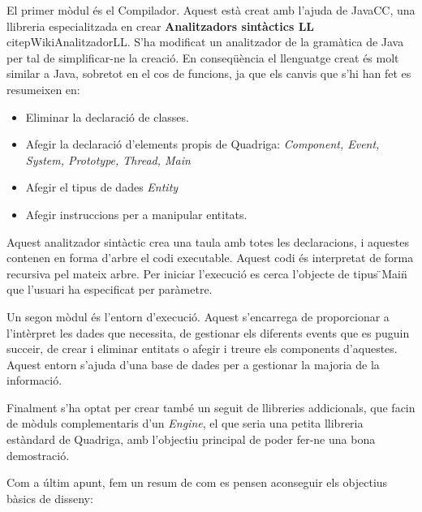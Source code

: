   El primer mòdul és el Compilador. Aquest està creat amb l'ajuda de JavaCC, una llibreria especialitzada en crear {\bf Analitzadors sintàctics LL} citep{WikiAnalitzadorLL}. S'ha modificat un analitzador de la gramàtica de Java per tal de simplificar-ne la creació. En conseqüència el llenguatge creat és molt similar a Java, sobretot en el cos de funcions, ja que els canvis que s'hi han fet es resumeixen en:
  
  \begin{itemize}
    \item Eliminar la declaració de classes.
    \item Afegir la declaració d'elements propis de Quadriga: {\em Component, Event, System, Prototype, Thread, Main}
    \item Afegir el tipus de dades {\em Entity}
    \item Afegir instruccions per a manipular entitats.
  \end{itemize}
  
  Aquest analitzador sintàctic crea una taula amb totes les declaracions, i aquestes contenen en forma d'arbre el codi executable. Aquest codi és interpretat de forma recursiva pel mateix arbre. Per iniciar l'execució es cerca l'objecte de tipus \"{}Main\"{} que l'usuari ha especificat per paràmetre.
  
  Un segon mòdul és l'entorn d'execució. Aquest s'encarrega de proporcionar a l'intèrpret les dades que necessita, de gestionar els diferents events que es puguin succeir, de crear i eliminar entitats o afegir i treure els components d'aquestes. Aquest entorn s'ajuda d'una base de dades per a gestionar la majoria de la informació.
  
  Finalment s'ha optat per crear també un seguit de llibreries addicionals, que facin de mòduls complementaris d'un {\em Engine}, el que seria una petita llibreria estàndard de Quadriga, amb l'objectiu principal de poder fer-ne una bona demostració.
  
  
  Com a últim apunt, fem un resum de com es pensen aconseguir els objectius bàsics de disseny:

